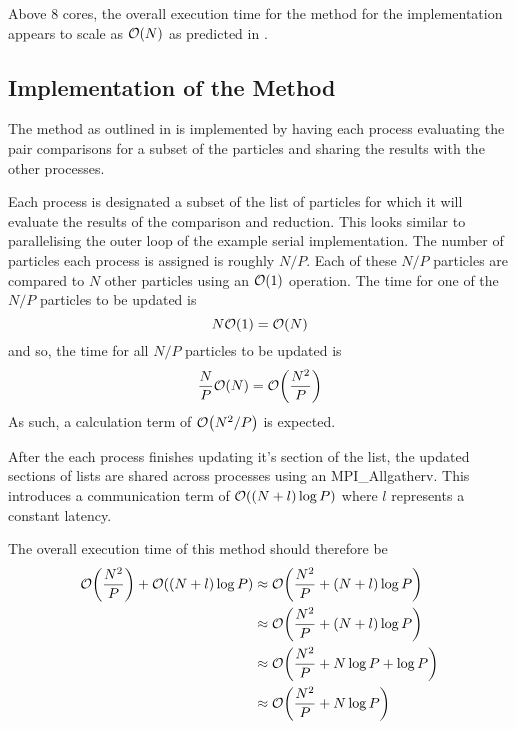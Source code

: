 Above 8 cores, the overall execution time for
the \individualoperation{} method for the \replicateddata{} implementation
appears to scale as $\mathcal{O}{\left({ N }\right)}$
as predicted in .


%
%

\subsection{Implementation of the \pairoperation{} Method}

The \pairoperation{} method as outlined in
is implemented by having each process evaluating the pair
comparisons for a subset of the particles and sharing the
results with the other processes.

Each process is designated a subset of the list of particles for which
it will evaluate the results of the comparison and reduction.
%
This looks similar to parallelising the outer loop of the example
serial implementation.
%
The number of particles each process is assigned is roughly $N/P$.
%
Each of these $N/P$ particles are compared to $N$ other particles
using an $\mathcal{O}{\left({ 1 }\right)}$ operation.
%
The time for one of the $N/P$ particles to be updated is
\begin{equation}
    N\mathcal{O}{\left({ 1 }\right)} = \mathcal{O}{\left({ N }\right)}
\end  {equation}
and so, the time for all $N/P$ particles to be updated is
\begin{equation}
    \frac{N}{P}\mathcal{O}{\left({ N }\right)} = \mathcal{O}{\left({ \frac{N^2}{P} }\right)}
\end  {equation}
As such, a calculation term of $\mathcal{O}{\left({ N^2/P }\right)}$ is expected.

After the each process finishes updating it's section of the list,
the updated sections of lists are shared across processes using
an MPI\_Allgatherv.
This introduces a communication term of $\mathcal{O}{\left({ (N + l)\log{P} }\right)}$
where $l$ represents a constant latency.

The overall execution time of this method should therefore be
\begin{align}
    \mathcal{O}{\left({ \frac{N^2}{P} }\right)} + \mathcal{O}{\left({ (N+l)\log{P} }\right)}
        &\approx{} \mathcal{O}{\left({ \frac{N^2}{P} + (N+l)\log{P} }\right)} \\
        &\approx{} \mathcal{O}{\left({ \frac{N^2}{P} + (N+l)\log{P} }\right)} \\
        &\approx{} \mathcal{O}{\left({ \frac{N^2}{P} + N\log{P} + \log{P} }\right)} \\
        \label{eqn:v0_replicated_pair_operation_overall_time}
        &\approx{} \mathcal{O}{\left({ \frac{N^2}{P} + N\log{P} }\right)}
\end  {align}

